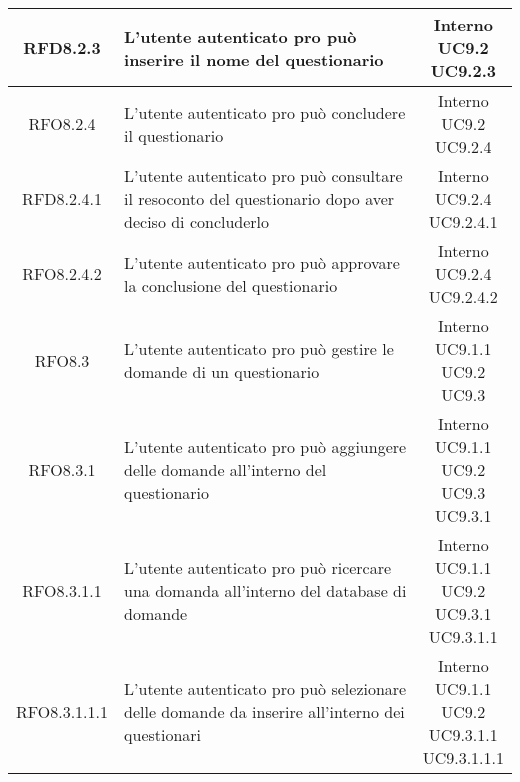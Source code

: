 \begin{longtable}{|c|>{\centering}m{7cm}|c|}
			 \hypertarget{{RFD8.2.3}}{{RFD8.2.3}} & L’utente autenticato pro può inserire il nome del questionario & \makecell{Interno\\ UC9.2 \\UC9.2.3 } \\ \hline
			 \hypertarget{{RFO8.2.4}}{{RFO8.2.4}} & L’utente autenticato pro può concludere il questionario & \makecell{Interno\\ UC9.2 \\UC9.2.4 } \\ \hline
			 \hypertarget{{RFD8.2.4.1}}{{RFD8.2.4.1}} & L’utente autenticato pro può consultare il resoconto del questionario dopo aver deciso di concluderlo & \makecell{Interno\\ UC9.2.4 \\UC9.2.4.1 } \\ \hline
			 \hypertarget{{RFO8.2.4.2}}{{RFO8.2.4.2}} & L’utente autenticato pro può approvare la conclusione del questionario & \makecell{Interno\\ UC9.2.4 \\UC9.2.4.2 } \\ \hline
			 \hypertarget{{RFO8.3}}{{RFO8.3}} & L’utente autenticato pro può gestire le domande di un questionario & \makecell{Interno\\ UC9.1.1 \\UC9.2 \\UC9.3 } \\ \hline
			 \hypertarget{{RFO8.3.1}}{{RFO8.3.1}} & L’utente autenticato pro può aggiungere delle domande all’interno del questionario & \makecell{Interno\\ UC9.1.1 \\UC9.2 \\UC9.3 \\UC9.3.1 } \\ \hline
			 \hypertarget{{RFO8.3.1.1}}{{RFO8.3.1.1}} & L’utente autenticato pro può ricercare una domanda all’interno del database di domande & \makecell{Interno\\ UC9.1.1 \\UC9.2 \\UC9.3.1 \\UC9.3.1.1 } \\ \hline
			 \hypertarget{{RFO8.3.1.1.1}}{{RFO8.3.1.1.1}} & L’utente autenticato pro può selezionare delle domande da inserire all’interno dei questionari & \makecell{Interno\\ UC9.1.1 \\UC9.2 \\UC9.3.1.1 \\UC9.3.1.1.1 } \\ \hline

\end{longtable}
